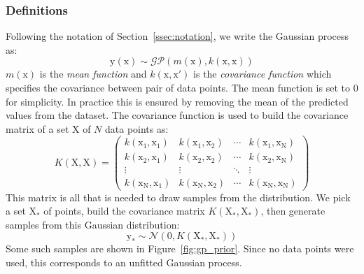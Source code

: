 \subsubsection{Definitions}

Following the notation of Section~\ref{ssec:notation}, we write the Gaussian process as:
\begin{equation}
    \mathrm{y}(\mathrm{x}) \sim \mathcal{GP} \left( m(\mathrm{x}), k(\mathrm{x}, \mathrm{x}) \right)
\end{equation}
$m(\mathrm{x})$ is the \textit{mean function} and $k(\mathrm{x}, \mathrm{x'})$ is the \textit{covariance function} which specifies the covariance between pair of data points. The mean function is set to $0$ for simplicity. In practice this is ensured by removing the mean of the predicted values from the dataset. The covariance function is used to build the covariance matrix of a set $\mathrm{X}$ of $N$ data points as:
\begin{equation}
    K(\mathrm{X}, \mathrm{X}) = 
    \begin{pmatrix}
    k(\mathrm{x_1}, \mathrm{x_1}) & k(\mathrm{x_1}, \mathrm{x_2}) & \cdots & k(\mathrm{x_1}, \mathrm{x_N}) \\
    k(\mathrm{x_2}, \mathrm{x_1}) & k(\mathrm{x_2}, \mathrm{x_2}) & \cdots & k(\mathrm{x_2}, \mathrm{x_N}) \\
    \vdots & \vdots & \ddots & \vdots \\
    k(\mathrm{x_N}, \mathrm{x_1}) & k(\mathrm{x_N}, \mathrm{x_2}) & \cdots & k(\mathrm{x_N}, \mathrm{x_N})
    \end{pmatrix}
\end{equation}
This matrix is all that is needed to draw samples from the distribution. We pick a set $\mathrm{X_*}$ of points, build the covariance matrix $K(\mathrm{X_*}, \mathrm{X_*})$, then generate samples from this Gaussian distribution:
\begin{equation}
    \mathrm{y_*} \sim \mathcal{N} \left( 0, K(\mathrm{X_*}, \mathrm{X_*})\right)
\end{equation}
Some such samples are shown in Figure~\ref{fig:gp_prior}. Since no data points were used, this corresponds to an unfitted Gaussian process. 


